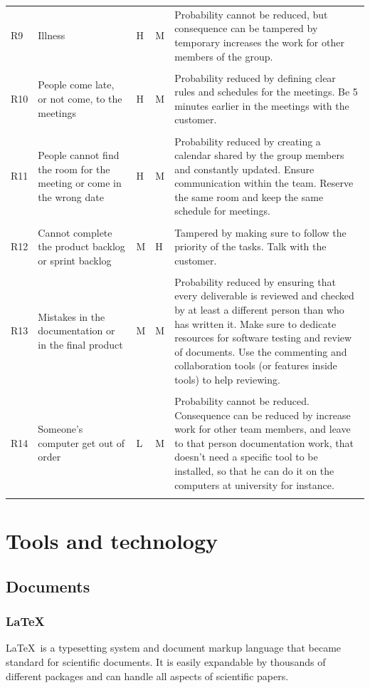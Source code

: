 \documentclass[11pt,a4paper,titlepage,oneside]{report}
\begin{document}
\begin{longtable}{p{0.7cm} p{2.5cm} p{0.7cm} p{0.7cm} p{7cm} }
R9 & Illness & H & M & Probability cannot be reduced, but consequence can be tampered by temporary increases the work for other members of the group. \\ \\ \hline
R10 & People come late, or not come, to the meetings & H & M & Probability reduced by defining clear rules and schedules for the meetings. Be 5 minutes earlier in the meetings with the customer. \\ \\ \hline
R11 & People cannot find the room for the meeting or come in the wrong date & H & M & Probability reduced by creating a calendar shared by the group members and constantly updated. Ensure communication within the team. Reserve the same room and keep the same schedule for meetings. \\ \\ \hline
R12 & Cannot complete the product backlog or sprint backlog & M & H & Tampered by making sure to follow the priority of the tasks. Talk with the customer. \\ \\ \hline
R13 & Mistakes in the documentation or in the final product & M & M & Probability reduced by ensuring that every deliverable is reviewed and checked by at least a different person than who has written it. Make sure to dedicate resources for software testing and review of documents. Use the commenting and collaboration tools (or features inside tools) to help reviewing. \\ \\ \hline
R14 & Someone’s computer get out of order & L & M & Probability cannot be reduced. Consequence can be reduced by increase work for other team members, and leave to that person documentation work, that doesn’t need a specific tool to be installed, so that he can do it on the computers at university for instance. \\ \\ \hline
\end{longtable}

\chapter{Tools and technology}
\section{Documents}

  \subsection{\LaTeX}
  \LaTeX~is a typesetting system and document markup language that became standard for scientific documents. It is easily expandable by thousands of different packages and can handle all aspects of scientific papers.
\end{document}
